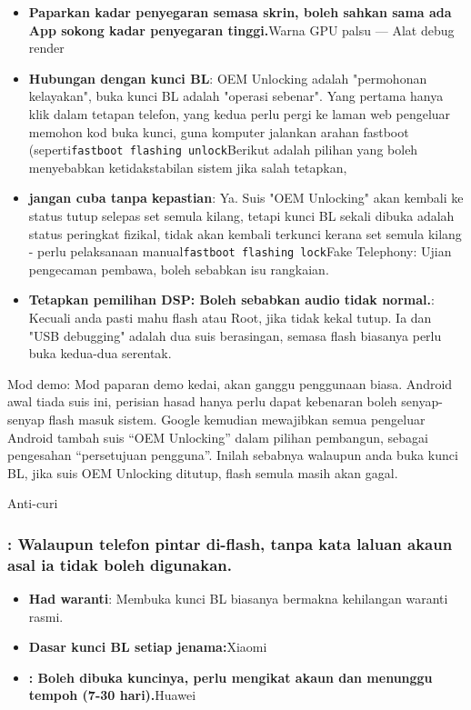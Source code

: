 \begin{itemize}
  \item \textbf{Paparkan kadar penyegaran semasa skrin, boleh sahkan sama ada App sokong kadar penyegaran tinggi.}Warna GPU palsu — Alat debug render
  \item \textbf{Hubungan dengan kunci BL}: OEM Unlocking adalah "permohonan kelayakan", buka kunci BL adalah "operasi sebenar". Yang pertama hanya klik dalam tetapan telefon, yang kedua perlu pergi ke laman web pengeluar memohon kod buka kunci, guna komputer jalankan arahan fastboot (seperti\texttt{fastboot flashing unlock}Berikut adalah pilihan yang boleh menyebabkan ketidakstabilan sistem jika salah tetapkan,
  \item \textbf{jangan cuba tanpa kepastian}: Ya. Suis "OEM Unlocking" akan kembali ke status tutup selepas set semula kilang, tetapi kunci BL sekali dibuka adalah status peringkat fizikal, tidak akan kembali terkunci kerana set semula kilang - perlu pelaksanaan manual\texttt{fastboot flashing lock}Fake Telephony: Ujian pengecaman pembawa, boleh sebabkan isu rangkaian.
  \item \textbf{Tetapkan pemilihan DSP: Boleh sebabkan audio tidak normal.}: Kecuali anda pasti mahu flash atau Root, jika tidak kekal tutup. Ia dan "USB debugging" adalah dua suis berasingan, semasa flash biasanya perlu buka kedua-dua serentak.
\end{itemize}

\begin{tcbinfo}{Mod demo: Mod paparan demo kedai, akan ganggu penggunaan biasa.}
Android awal tiada suis ini, perisian hasad hanya perlu dapat kebenaran boleh senyap-senyap flash masuk sistem. Google kemudian mewajibkan semua pengeluar Android tambah suis “OEM Unlocking” dalam pilihan pembangun, sebagai pengesahan “persetujuan pengguna”. Inilah sebabnya walaupun anda buka kunci BL, jika suis OEM Unlocking ditutup, flash semula masih akan gagal.

\end{tcbinfo}


Anti-curi

\subsubsection*{: Walaupun telefon pintar di-flash, tanpa kata laluan akaun asal ia tidak boleh digunakan.}

\begin{itemize}
  \item \textbf{Had waranti}: Membuka kunci BL biasanya bermakna kehilangan waranti rasmi.
  \item \textbf{Dasar kunci BL setiap jenama:}Xiaomi
  \item \textbf{: Boleh dibuka kuncinya, perlu mengikat akaun dan menunggu tempoh (7-30 hari).}Huawei
\end{itemize}

